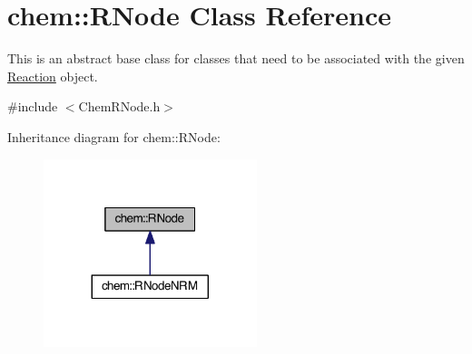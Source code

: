 \hypertarget{classchem_1_1RNode}{\section{chem\-:\-:R\-Node Class Reference}
\label{classchem_1_1RNode}
}


This is an abstract base class for classes that need to be associated with the given \hyperlink{classchem_1_1Reaction}{Reaction} object.  




{\ttfamily \#include $<$Chem\-R\-Node.\-h$>$}



Inheritance diagram for chem\-:\-:R\-Node\-:\nopagebreak
\begin{figure}[H]
\begin{center}
\leavevmode
\includegraphics[width=176pt]{classchem_1_1RNode__inherit__graph}
\end{center}
\end{figure}

